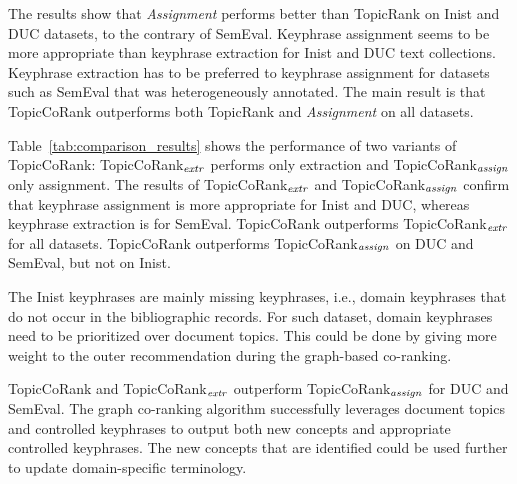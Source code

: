  The results show that \textit{Assignment} performs better than TopicRank on Inist and DUC datasets, to the contrary of
  SemEval. 
  Keyphrase assignment seems to be more appropriate than keyphrase extraction for Inist and DUC text collections.
  Keyphrase extraction has to be preferred to keyphrase assignment for datasets such as SemEval that was heterogeneously annotated. 
  The main result is that TopicCoRank outperforms both TopicRank and \textit{Assignment} on all
  datasets. 
  
  Table~\ref{tab:comparison_results} shows the performance of two variants of TopicCoRank: TopicCoRank$_\textnormal{\textit{extr}}$ performs only  extraction
  and  TopicCoRank$_\textnormal{\textit{assign}}$ only assignment.
  The results of TopicCoRank$_\textnormal{\textit{extr}}$ and 
  TopicCoRank$_\textnormal{\textit{assign}}$ confirm that keyphrase assignment is more appropriate for 
  Inist and DUC, whereas keyphrase extraction is for SemEval.
  TopicCoRank outperforms TopicCoRank$_\textnormal{\textit{extr}}$ for all datasets.
  TopicCoRank outperforms TopicCoRank$_\textnormal{\textit{assign}}$ on DUC and SemEval, but not on Inist.
  
  The Inist keyphrases are mainly missing keyphrases, i.e., domain keyphrases that do not occur in the bibliographic records. 
  For such dataset, domain keyphrases need to be prioritized over document topics. This could be done by giving more weight to the outer recommendation during the graph-based co-ranking.
  
  TopicCoRank and TopicCoRank$_\textnormal{\textit{extr}}$ outperform TopicCoRank$_\textnormal{\textit{assign}}$ for DUC and SemEval.
  The graph co-ranking algorithm successfully leverages document topics and
  controlled keyphrases to output both new concepts and appropriate controlled keyphrases.
  The new concepts that are identified could be used further to update domain-specific terminology.

